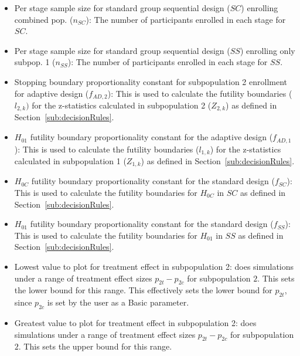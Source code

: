 \documentclass[article]{jss}
\begin{document}
\begin{itemize}
\item Per stage sample size for standard group sequential design ($SC$) enrolling combined pop. ($n_{SC}$): The number of participants enrolled in each stage for $SC$.

\item Per stage sample size for standard group sequential design ($SS$) enrolling only subpop. 1 ($n_{SS}$): The number of participants enrolled in each stage for $SS$.

\item Stopping boundary proportionality constant for subpopulation 2 enrollment for adaptive design ($f_{AD,2}$): This is used to calculate the futility boundaries ($l_{2,k})$ for the z-statistics calculated in subpopulation 2 ($Z_{2,k}$) as defined in Section~\ref{sub:decisionRules}.

\item $H_{01}$ futility boundary proportionality constant for the adaptive design ($f_{AD,1}$):  This is used to calculate the futility boundaries ($l_{1,k}$) for the z-statistics calculated in subpopulation 1 ($Z_{1,k}$) as defined in Section~\ref{sub:decisionRules}.


\item $H_{0C}$ futility boundary proportionality constant for the standard design ($f_{SC}$): This is used to calculate the futility boundaries for $H_{0C}$ in $SC$ as defined in Section~\ref{sub:decisionRules}. 

\item $H_{01}$ futility boundary proportionality constant for the standard design ($f_{SS}$):  This is used to calculate the futility boundaries for $H_{01}$ in $SS$ as defined in Section~\ref{sub:decisionRules}. 

\item Lowest value to plot for treatment effect in subpopulation 2:  does simulations under a range of treatment effect sizes $p_{2t}-p_{2c}$ for subpopulation $2$. This sets the lower bound for this range. This effectively sets the lower bound for $p_{2t}$, since $p_{2c}$ is set by the user as a Basic parameter.

\item Greatest value to plot for treatment effect in subpopulation 2:  does simulations under a range of treatment effect sizes $p_{2t}-p_{2c}$ for subpopulation $2$. This sets the upper bound for this range.


\end{itemize}
\end{document}
